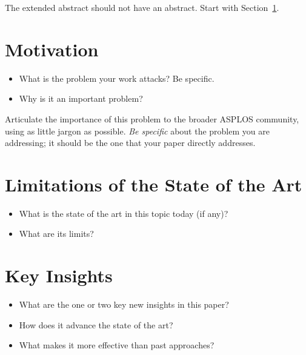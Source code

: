 \documentclass[pageno]{jpaper}
\begin{document}


The extended abstract should not have an abstract. Start with Section~\ref{sec:motivation}.

\section{Motivation}
\label{sec:motivation}


\begin{itemize}
\item What is the problem your work attacks? Be specific.
\item Why is it an important problem?
\end{itemize}

\vspace{1em}

\noindent
Articulate the importance of this problem to the broader ASPLOS
community, using as little jargon as possible. \emph{Be specific}
about the problem you are addressing; it should be the one that your
paper directly addresses.

\section{Limitations of the State of the Art}
\label{sec:limitations}

\begin{itemize}
\item What is the state of the art in this topic today (if any)?
\item What are its limits?
\end{itemize}

\section{Key Insights}
\label{sec:key-insights}

\begin{itemize}
\item What are the one or two key new insights in this paper?
\item How does it advance the state of the art?
\item What makes it more effective than past approaches?
\end{itemize}
\end{document}
